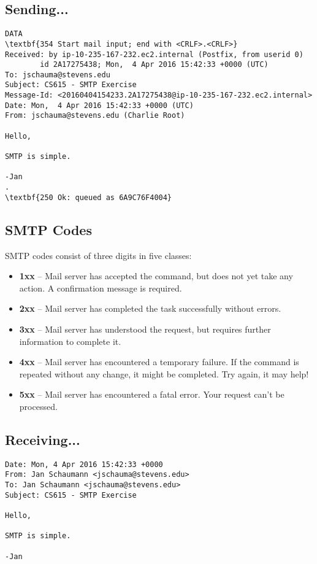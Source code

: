 \documentclass[xga]{xdvislides}
\begin{document}
\subsection{Sending...}
\begin{Verbatim}
DATA
\textbf{354 Start mail input; end with <CRLF>.<CRLF>}
Received: by ip-10-235-167-232.ec2.internal (Postfix, from userid 0)
        id 2A17275438; Mon,  4 Apr 2016 15:42:33 +0000 (UTC)
To: jschauma@stevens.edu
Subject: CS615 - SMTP Exercise
Message-Id: <20160404154233.2A17275438@ip-10-235-167-232.ec2.internal>
Date: Mon,  4 Apr 2016 15:42:33 +0000 (UTC)
From: jschauma@stevens.edu (Charlie Root)

Hello,

SMTP is simple.

-Jan
.
\textbf{250 Ok: queued as 6A9C76F4004}
\end{Verbatim}

\subsection{SMTP Codes}
SMTP codes consist of three digits in five classes:
\begin{itemize}
	\item {\bf 1xx} --  Mail server has accepted the command, but does not yet
		take any action. A confirmation message is required.
	\item {\bf 2xx} --  Mail server has completed the task successfully
		without errors.
	\item {\bf 3xx} --  Mail server has understood the request, but requires
		further information to complete it.
	\item {\bf 4xx} --  Mail server has encountered a temporary failure. If
		the command is repeated without any change, it might be
		completed. Try again, it may help!
	\item {\bf 5xx} --  Mail server has encountered a fatal error. Your
		request can't be processed.
\end{itemize}

\subsection{Receiving...}
\begin{verbatim}
Date: Mon, 4 Apr 2016 15:42:33 +0000
From: Jan Schaumann <jschauma@stevens.edu>
To: Jan Schaumann <jschauma@stevens.edu>
Subject: CS615 - SMTP Exercise

Hello,

SMTP is simple.

-Jan
\end{verbatim}
\end{document}
